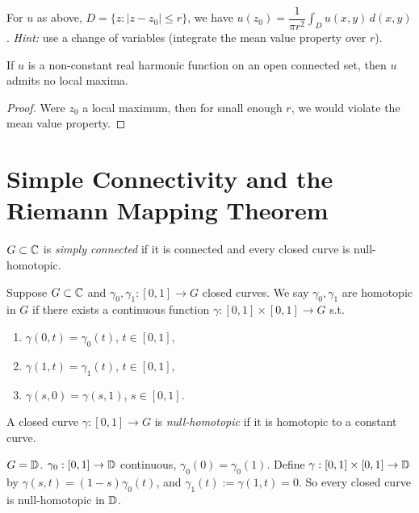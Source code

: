 \documentclass[11pt]{article}
\begin{document}
\begin{exercise}
For $u$ as above, $D=\{z : |z-z_0|\le r\}$, we have $u(z_0) = \dfrac{1}{\pi r^2}\int_D u(x,y)\,d(x,y)$. \emph{Hint:} use a change of variables (integrate the mean value property over $r$).
\end{exercise}

\begin{corollary}
If $u$ is a non-constant real harmonic function on an open connected set, then $u$ admits no local maxima.
\end{corollary}
\begin{proof}
Were $z_0$ a local maximum, then for small enough $r$, we would violate the mean value property.
\end{proof}

\newpage
\section{Simple Connectivity and the Riemann Mapping Theorem}

\begin{definition}
$G\subset{\mathbb{C}}$ is \emph{simply connected} if it is connected and every closed curve is null-homotopic.
\end{definition}

\begin{definition}[Homotopy]
Suppose $G\subset{\mathbb{C}}$ and $\gamma_0,\gamma_1:[0,1]\to G$ closed curves. We say $\gamma_0,\gamma_1$ are homotopic in $G$ if there exists a continuous function $\gamma:[0,1]\times[0,1]\to G$ s.t.
\begin{enumerate}
    \item[(1)] $\gamma(0,t) = \gamma_0(t)$, $t\in[0,1]$,
    \item[(2)] $\gamma(1,t) = \gamma_1(t)$, $t\in[0,1]$,
    \item[(3)] $\gamma(s,0)=\gamma(s,1)$, $s\in[0,1]$.
\end{enumerate}
A closed curve $\gamma:[0,1]\to G$ is \emph{null-homotopic} if it is homotopic to a constant curve.
\end{definition}

\begin{example}
$G={\mathbb{D}}$. $\gamma_0:[0,1]\to{\mathbb{D}}$ continuous, $\gamma_0(0)=\gamma_0(1)$. Define $\gamma:[0,1]\times[0,1]\to{\mathbb{D}}$ by $\gamma(s,t) = (1-s)\gamma_0(t)$, and $\gamma_1(t):=\gamma(1,t)=0$. So every closed curve is null-homotopic in ${\mathbb{D}}$.
\end{example}
\end{document}
